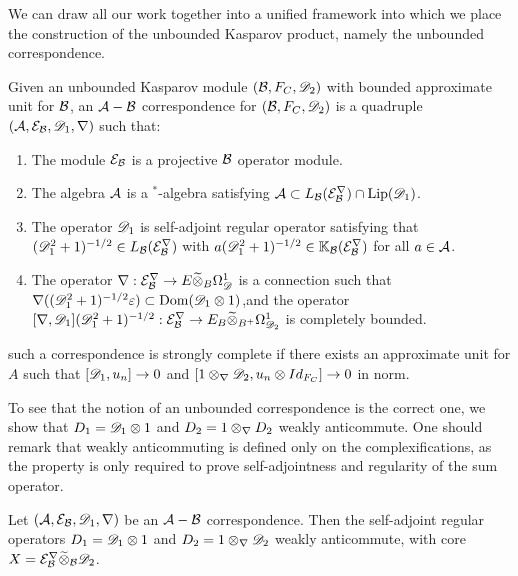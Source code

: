 We can draw all our work together into a unified framework into which we place the construction of the unbounded Kasparov product, namely the unbounded correspondence. 
\begin{definition}
	Given an unbounded Kasparov module $(\mathcal{B},F_C,\mathscr{D}_2)$ with bounded approximate unit for $\mathcal{B}$, an $\mathcal{A}-\mathcal{B}$ correspondence for $(\mathcal{B},F_C,\mathscr{D}_2)$ is a quadruple $(\mathcal{A},\mathcal{E}_{\mathcal{B}},\mathscr{D}_1,\nabla)$ such that:
	\begin{enumerate}
		\item
			The module $\mathcal{E}_{\mathcal{B}}$ is a projective $\mathcal{B}$ operator module. 
		\item
			The algebra $\mathcal{A}$ is a $^*$-algebra satisfying $\mathcal{A}\subset L_{\mathcal{B}}(\mathcal{E}^\nabla_{\mathcal{B}})\cap \operatorname{Lip}(\mathscr{D}_1)$. 
		\item
			The operator $\mathscr{D}_1$ is self-adjoint regular operator satisfying that $(\mathscr{D}_1^2+1)^{-1/2}\in L_{\mathcal{B}}(\mathcal{E}^\nabla_{\mathcal{B}})$ with $a(\mathscr{D}_1^2+1)^{-1/2}\in \mathbb{K}_{\mathcal{B}}(\mathcal{E}^\nabla_{\mathcal{B}})$ for all $a\in \mathcal{A}$. 
		\item
			The operator $\nabla:\mathcal{E}^\nabla_{\mathcal{B}}\to E\widetilde{\otimes}_B \Omega^1_{\mathscr{D}}$ is a connection  such that $\nabla((\mathscr{D}_1^2+1)^{-1/2}\varepsilon)\subset \operatorname{Dom} (\mathscr{D}_1 \otimes 1)$,and the operator $[\nabla, \mathscr{D}_1](\mathscr{D}_1^2+1)^{-1/2}:\mathcal{E}_{\mathcal{B}}^\nabla \to E_B\widetilde{\otimes}_{B^+} \Omega^1_{\mathscr{D}_2}$ is completely bounded. 
	\end{enumerate}
	such a correspondence is strongly complete if there exists an approximate unit for $A$ such that $[\mathscr{D}_1,u_n]\to 0$ and $[1\otimes_\nabla \mathscr{D}_2,u_n\otimes Id_{F_C}]\to 0$ in norm.
\end{definition}
To see that the notion of an unbounded correspondence is the correct one, we show that $D_1=\mathscr{D}_1\otimes 1$ and $D_2=1\otimes_\nabla D_2$  weakly anticommute. One should remark that weakly anticommuting is defined only on the complexifications, as the property is only required to prove self-adjointness and regularity of the sum operator. 
\begin{lemma}\label{mesrennie42}
	Let $(\mathcal{A},\mathcal{E}_{\mathcal{B}},\mathscr{D}_1,\nabla)$ be an $\mathcal{A}-\mathcal{B}$ correspondence. Then the self-adjoint regular operators $D_1=\mathscr{D}_1\otimes 1$ and $D_2=1\otimes_\nabla \mathscr{D}_2$ weakly anticommute, with core $X=\mathcal{E}_{\mathcal{B}}^\nabla \widetilde{\otimes}_{\mathcal{B}} \mathscr{D}_2$. 
\end{lemma}
